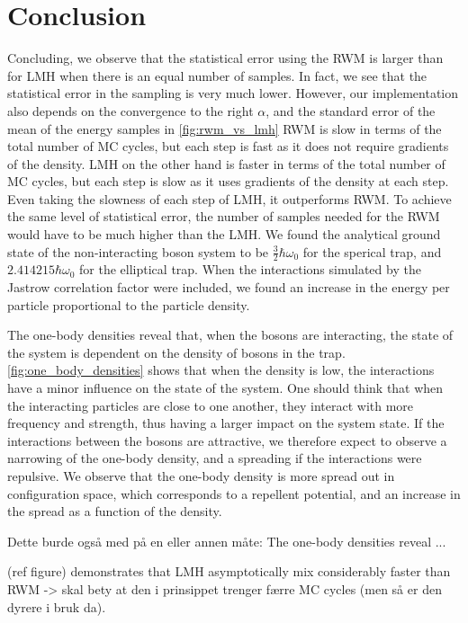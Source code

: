 \section{Conclusion}\label{sec:Conclusion}

Concluding, we observe that the statistical error using the RWM is larger than for LMH when there is an equal number of samples. In fact, we see that the statistical error in the sampling is very much lower. However, our implementation also depends on the convergence to the right $\alpha$, and the standard error of the mean of the energy samples in \autoref{fig:rwm_vs_lmh}
RWM is slow in terms of the total number of MC cycles, but each step is fast as it does not require gradients of the density. LMH on the other hand is faster in terms of the total number of MC cycles, but each step is slow as it uses gradients of the density at each step. Even taking the slowness of each step of LMH, it outperforms RWM. To achieve the same level of statistical error, the number of samples needed for the RWM would have to be much higher than the LMH. 
We found the analytical ground state of the non-interacting boson system to be $\frac{3}{2}\hbar\omega_0$ for the sperical trap, and $2.414215\hbar\omega_0$ for the elliptical trap. When the interactions simulated by the Jastrow correlation factor were included, we found an increase in the energy per particle proportional to the particle density. 

The one-body densities reveal that, when the bosons are interacting, the state of the system is dependent on the density of bosons in the trap. \autoref{fig:one_body_densities} shows that when the density is low, the interactions have a minor influence on the state of the system. One should think that when the interacting particles are close to one another, they interact with more frequency and strength, thus having a larger impact on the system state. If the interactions between the bosons are attractive, we therefore expect to observe a narrowing of the one-body density, and a spreading if the interactions were repulsive. We observe that the one-body density is more spread out in configuration space, which corresponds to a repellent potential, and an increase in the spread as a function of the density. 

Dette burde også med på en eller annen måte: The one-body densities reveal ...


(ref figure) demonstrates that LMH asymptotically mix considerably faster than RWM -> skal bety at den i prinsippet trenger færre MC cycles (men så er den dyrere i bruk da). 

